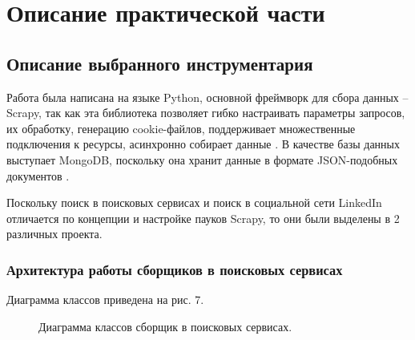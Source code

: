 \section{Описание практической части}
\label{sec:Chapter4} 
\subsection{Описание выбранного инструментария}
Работа была написана на языке Python, основной фреймворк для сбора данных -- Scrapy, так как эта библиотека позволяет
гибко настраивать параметры запросов, их обработку, генерацию cookie-файлов, поддерживает множественные подключения к ресурсы, 
асинхронно собирает данные \cite{scrapyBook}. В качестве базы данных
выступает MongoDB, поскольку она хранит данные в формате JSON-подобных документов \cite{mongoDBBook}. 

\par
Поскольку поиск в поисковых сервисах и поиск в социальной сети LinkedIn отличается по концепции и настройке пауков Scrapy, то
они были выделены в 2 различных проекта.

\subsubsection{Архитектура работы сборщиков в поисковых сервисах}
\par
Диаграмма классов приведена на рис. 7.

\begin{figure}[H]
    \caption{Диаграмма классов сборщик в поисковых сервисах.}
    \label{ris:image}
\end{figure}


